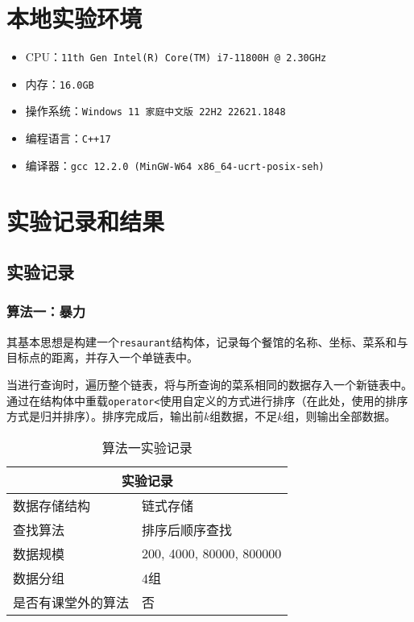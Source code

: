 \documentclass{article}
\begin{document}
\normalsize

\section{本地实验环境}
\large

\begin{itemize}[noitemsep]
    \item CPU：\texttt{11th Gen Intel(R) Core(TM) i7-11800H @ 2.30GHz}
    \item 内存：\texttt{16.0GB}
    \item 操作系统：\texttt{Windows 11 家庭中文版 22H2 22621.1848}
    \item 编程语言：\texttt{C++17}
    \item 编译器：\texttt{gcc 12.2.0 (MinGW-W64 x86\_64-ucrt-posix-seh)}
\end{itemize}


\section{实验记录和结果}
\subsection{实验记录}
\large
\subsubsection{算法一：暴力}
其基本思想是构建一个\texttt{resaurant}结构体，记录每个餐馆的名称、坐标、菜系和与目标点的距离，并存入一个单链表中。

当进行查询时，遍历整个链表，将与所查询的菜系相同的数据存入一个新链表中。通过在结构体中重载\texttt{operator<}使用自定义的方式进行排序（在此处，使用的排序方式是归并排序）。排序完成后，输出前$k$组数据，不足$k$组，则输出全部数据。
\begin{table}[H]
    \centering
    \begin{tabular}{|p{4cm}<{\centering}|p{6cm}<{\centering}|}
        \hline
        \multicolumn{2}{|c|}{实验记录}                \\
        \hline
        数据存储结构       & 链式存储                 \\
        \hline
        查找算法           & 排序后顺序查找           \\
        \hline
        数据规模           & 200, 4000, 80000, 800000 \\
        \hline
        数据分组           & 4组                      \\
        \hline
        是否有课堂外的算法 & 否                       \\
        \hline
    \end{tabular}
    \caption{算法一实验记录}
\end{table}
\end{document}
